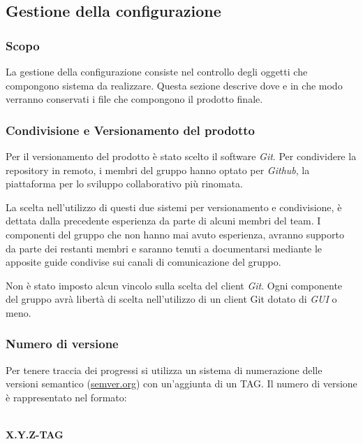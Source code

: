 \subsection{Gestione della configurazione}
\subsubsection{Scopo}
La gestione della configurazione consiste nel controllo degli oggetti che compongono sistema da realizzare. Questa sezione descrive dove e in che modo verranno conservati i file che compongono il prodotto finale.

\subsubsection{Condivisione e Versionamento del prodotto}
Per il versionamento del prodotto è stato scelto il software \textit{Git\glos}. Per condividere la repository in remoto, i membri del gruppo hanno optato per \textit{Github\glos}, la piattaforma per lo sviluppo collaborativo più rinomata. 

\noindent La scelta nell'utilizzo di questi due sistemi per versionamento e condivisione, è dettata dalla precedente esperienza da parte di alcuni membri del team. I componenti del gruppo che non hanno mai avuto esperienza, avranno supporto da parte dei restanti membri e saranno tenuti a documentarsi mediante le apposite guide condivise sui canali di comunicazione del gruppo. 

\noindent Non è stato imposto alcun vincolo sulla scelta del client \textit{Git\glos}. Ogni componente del gruppo avrà libertà di scelta nell'utilizzo di un client Git dotato di \textit{GUI\glo} o meno. 

\subsubsection{Numero di versione}
Per tenere traccia dei progressi si utilizza un sistema di numerazione delle versioni
semantico (\href{https://semver.org/lang/it/}{semver.org}) con un'aggiunta di un TAG.
Il numero di versione è rappresentato nel formato:\\\\

\centerline{\textbf{X.Y.Z-TAG}}


